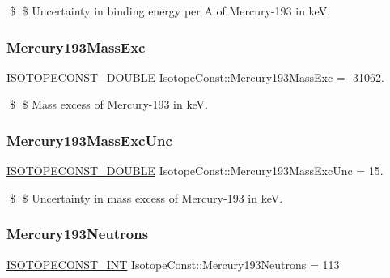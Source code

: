 \$ \$ Uncertainty in binding energy per A of Mercury-\/193 in keV. \mbox{\label{group___isotope_const-_mercury-_hg193_ga07823aa316c547246f6b3740f02c2f6a}} 
\subsubsection{\texorpdfstring{Mercury193\+Mass\+Exc}{Mercury193MassExc}}
{\footnotesize\ttfamily \mbox{\hyperlink{group___isotope_const-_macros_ga8f45a7272ce02c0b4c65c44636ed719a}{I\+S\+O\+T\+O\+P\+E\+C\+O\+N\+S\+T\+\_\+\+D\+O\+U\+B\+LE}} Isotope\+Const\+::\+Mercury193\+Mass\+Exc = -\/31062.}

\$ \$ Mass excess of Mercury-\/193 in keV. \mbox{\label{group___isotope_const-_mercury-_hg193_ga371846459b79d0fe926a73cf85f67888}} 
\subsubsection{\texorpdfstring{Mercury193\+Mass\+Exc\+Unc}{Mercury193MassExcUnc}}
{\footnotesize\ttfamily \mbox{\hyperlink{group___isotope_const-_macros_ga8f45a7272ce02c0b4c65c44636ed719a}{I\+S\+O\+T\+O\+P\+E\+C\+O\+N\+S\+T\+\_\+\+D\+O\+U\+B\+LE}} Isotope\+Const\+::\+Mercury193\+Mass\+Exc\+Unc = 15.}

\$ \$ Uncertainty in mass excess of Mercury-\/193 in keV. \mbox{\label{group___isotope_const-_mercury-_hg193_ga81a35a74df0208d6dd245ed9e5d4c289}} 
\subsubsection{\texorpdfstring{Mercury193\+Neutrons}{Mercury193Neutrons}}
{\footnotesize\ttfamily \mbox{\hyperlink{group___isotope_const-_macros_ga5f18360b3e99483a35c32d789e62621c}{I\+S\+O\+T\+O\+P\+E\+C\+O\+N\+S\+T\+\_\+\+I\+NT}} Isotope\+Const\+::\+Mercury193\+Neutrons = 113}

